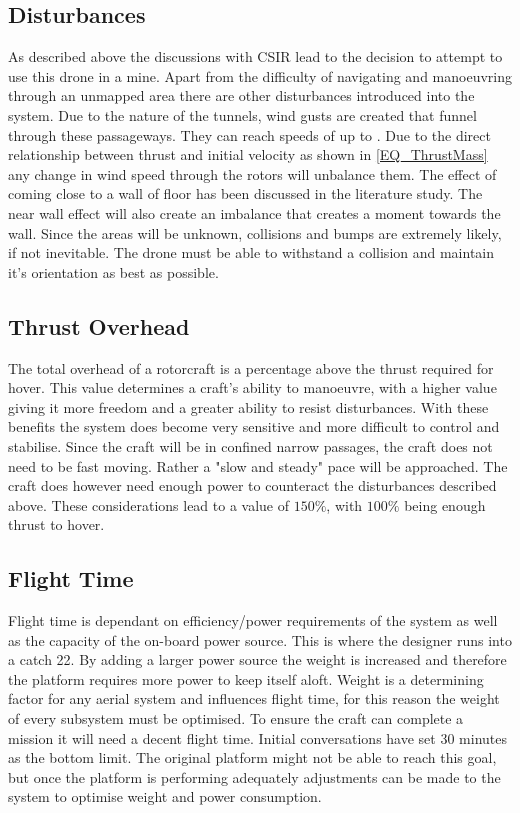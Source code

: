 \subsection{Disturbances}
As described above the discussions with CSIR lead to the decision to attempt to use this drone in a mine. Apart from the difficulty of navigating and manoeuvring through an unmapped area there are other disturbances introduced into the system. 
Due to the nature of the tunnels, wind gusts are created that funnel through these passageways. They can reach speeds of up to . Due to the direct relationship between thrust and initial velocity as shown in \eqref{EQ_ThrustMass} any change in wind speed through the rotors will unbalance them.
The effect of coming close to a wall of floor has been discussed in the literature study. The near wall effect will also create an imbalance that creates a moment towards the wall. 
Since the areas will be unknown, collisions and bumps are extremely likely, if not inevitable. The drone must be able to withstand a collision and maintain it's orientation as best as possible.

\subsection{Thrust Overhead}
The total overhead of a rotorcraft is a percentage above the thrust required for hover. This value determines a craft's ability to manoeuvre, with a higher value giving it more freedom and a greater ability to resist disturbances. With these benefits the system does become very sensitive and more difficult to control and stabilise. Since the craft will be in confined narrow passages, the craft does not need to be fast moving. Rather a "slow and steady" pace will be approached. The craft does however need enough power to counteract the disturbances described above. These considerations lead to a value of $150\%$, with $100\%$ being enough thrust to hover. 

\subsection{Flight Time}
Flight time is dependant on efficiency/power requirements of the system as well as the capacity of the on-board power source. This is where the designer runs into a catch 22. By adding a larger power source the weight is increased and therefore the platform requires more power to keep itself aloft. Weight is a determining factor for any aerial system and influences flight time, for this reason the weight of every subsystem must be optimised. To ensure the craft can complete a mission it will need a decent flight time. Initial conversations have set 30 minutes as the bottom limit. The original platform might not be able to reach this goal, but once the platform is performing adequately adjustments can be made to the system to optimise weight and power consumption. 

